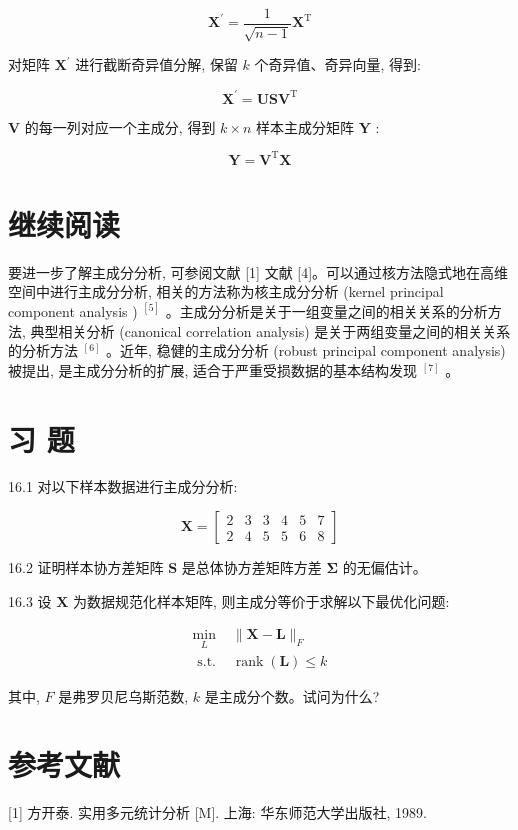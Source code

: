 \documentclass[10pt]{article}
\begin{document}
$$
\boldsymbol{X}^{\prime}=\frac{1}{\sqrt{n-1}} \boldsymbol{X}^{\mathrm{T}}
$$

对矩阵 $\boldsymbol{X}^{\prime}$ 进行截断奇异值分解, 保留 $k$ 个奇异值、奇异向量, 得到:

$$
\boldsymbol{X}^{\prime}=\boldsymbol{U} \boldsymbol{S} \boldsymbol{V}^{\mathrm{T}}
$$

$\boldsymbol{V}$ 的每一列对应一个主成分, 得到 $k \times n$ 样本主成分矩阵 $\boldsymbol{Y}$ :

$$
\boldsymbol{Y}=\boldsymbol{V}^{\mathrm{T}} \boldsymbol{X}
$$

\section*{继续阅读}
要进一步了解主成分分析, 可参阅文献 [1] 文献 [4]。可以通过核方法隐式地在高维空间中进行主成分分析, 相关的方法称为核主成分分析 (kernel principal component analysis ) ${ }^{[5]}$ 。主成分分析是关于一组变量之间的相关关系的分析方法, 典型相关分析 (canonical correlation analysis) 是关于两组变量之间的相关关系的分析方法 ${ }^{[6]}$ 。近年, 稳健的主成分分析 (robust principal component analysis) 被提出, 是主成分分析的扩展, 适合于严重受损数据的基本结构发现 ${ }^{[7]}$ 。

\section*{习 题}
16.1 对以下样本数据进行主成分分析:

$$
\boldsymbol{X}=\left[\begin{array}{llllll}
2 & 3 & 3 & 4 & 5 & 7 \\
2 & 4 & 5 & 5 & 6 & 8
\end{array}\right]
$$

16.2 证明样本协方差矩阵 $\boldsymbol{S}$ 是总体协方差矩阵方差 $\boldsymbol{\Sigma}$ 的无偏估计。

16.3 设 $\boldsymbol{X}$ 为数据规范化样本矩阵, 则主成分等价于求解以下最优化问题:

$$
\begin{array}{ll}
\min _{L} & \|\boldsymbol{X}-\boldsymbol{L}\|_{F} \\
\text { s.t. } & \operatorname{rank}(\boldsymbol{L}) \leqslant k
\end{array}
$$

其中, $F$ 是弗罗贝尼乌斯范数, $k$ 是主成分个数。试问为什么?

\section*{参考文献}
[1] 方开泰. 实用多元统计分析 [M]. 上海: 华东师范大学出版社, 1989.
\end{document}
